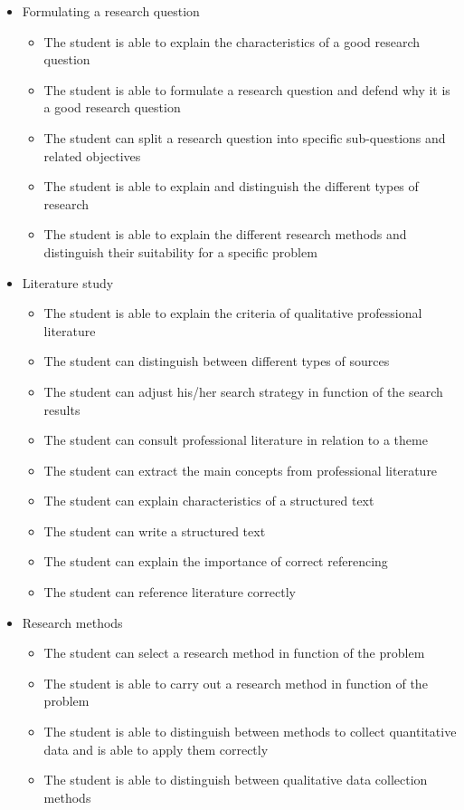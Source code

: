 \begin{itemize}
  \item Formulating a research question
        \begin{itemize}           
          \item The student is able to explain the characteristics of a good research question
          \item The student is able to formulate a research question and defend why it is a good research question
          \item The student can split a research question into specific sub-questions and related objectives
          \item The student is able to explain and distinguish the different types of research
          \item The student is able to explain the different research methods and distinguish their suitability for a specific problem
        \end{itemize}

  \item Literature study
        \begin{itemize}               
          \item The student is able to explain the criteria of qualitative professional literature
          \item The student can distinguish between different types of sources
          \item The student can adjust his/her search strategy in function of the search results
          \item The student can consult professional literature in relation to a theme
          \item The student can extract the main concepts from professional literature
          \item The student can explain characteristics of a structured text
          \item The student can write a structured text
          \item The student can explain the importance of correct referencing
          \item The student can reference literature correctly
        \end{itemize}

  \item Research methods
        \begin{itemize}                  
          \item The student can select a research method in function of the problem 
          \item The student is able to carry out a research method in function of the problem 
          \item The student is able to distinguish between methods to collect quantitative data and is able to apply them correctly
          \item The student is able to distinguish between qualitative data collection methods 
        \end{itemize}


\end{itemize}
